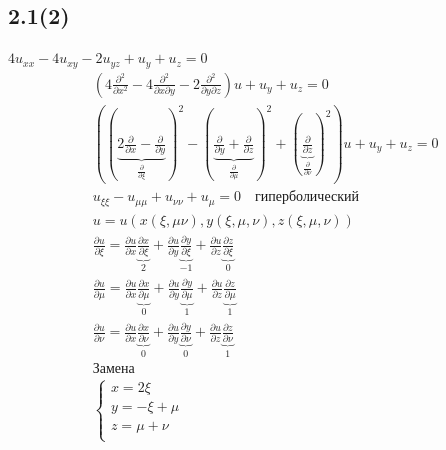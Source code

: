 \subsection{2.1(2)}
$4u_{xx}-4u_{xy}-2u_{yz}+u_{y}+u_{z}=0$
\begin{align*}
&  \left(4 \frac{\partial^{2}}{\partial x^{2}}-4 \frac{\partial^{2}}{\partial x\partial y}-2
  \frac{\partial^{2}}{\partial y\partial z} \right)u+u_{y}+u_{z}=0 \\
 & \left( \left(\underbrace{2\frac{\partial}{\partial x}
    -\frac{\partial}{\partial y}}_{ \frac{\partial}{\partial\xi}}\right)^{2}-\left( 
    \underbrace{\frac{\partial}{\partial y}
 +\frac{\partial}{\partial z}}_{ \frac{\partial}{\partial \mu}}\right)^{2}+\left( \underbrace{
\frac{\partial}{\partial z}}_{ \frac{\partial}{\partial \nu}}\right)^{2}\right)u
  +u_{y}+u_{z}=0\\
 & u_{\xi\xi}-u_{\mu \mu}+u_{\nu \nu}+u_{\mu}=0 \quad \text{гиперболический} \\
 & u = u(x(\xi,\mu\nu),y(\xi,\mu,\nu),z(\xi,\mu,\nu)) \\
 & \frac{\partial u}{\partial \xi} = \frac{\partial u}{\partial x}\underbrace{\frac{\partial x}{\partial \xi}}_{2}+
 \frac{\partial u}{\partial y}\underbrace{\frac{\partial y}{\partial \xi}}_{-1}+
 \frac{\partial u}{\partial z}\underbrace{\frac{\partial z}{\partial \xi}}_{0} \\
 & \frac{\partial u}{\partial \mu} = \frac{\partial u}{\partial x}\underbrace{\frac{\partial x}{\partial \mu}}_{0}+
 \frac{\partial u}{\partial y}\underbrace{\frac{\partial y}{\partial \mu}}_{1}+
 \frac{\partial u}{\partial z}\underbrace{\frac{\partial z}{\partial \mu}}_{1} \\
 & \frac{\partial u}{\partial \nu} = \frac{\partial u}{\partial x}\underbrace{\frac{\partial x}{\partial \nu}}_{0}+
 \frac{\partial u}{\partial y}\underbrace{\frac{\partial y}{\partial \nu}}_{0}+
 \frac{\partial u}{\partial z}\underbrace{\frac{\partial z}{\partial \nu}}_{1} \\
 & \text{Замена} \\
 & \begin{cases}
   x = 2\xi \\ y =-\xi + \mu \\ z = \mu + \nu \\ 
  \end{cases} \\
\end{align*}

